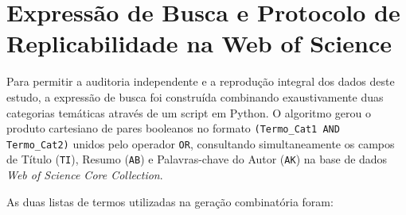 \appendix
\section{Expressão de Busca e Protocolo de Replicabilidade na Web of Science}\label{apendice:query_wos}

Para permitir a auditoria independente e a reprodução integral dos dados deste estudo, a expressão de busca foi construída combinando exaustivamente duas categorias temáticas através de um script em Python. O algoritmo gerou o produto cartesiano de pares booleanos no formato \texttt{(Termo\_Cat1 AND Termo\_Cat2)} unidos pelo operador \texttt{OR}, consultando simultaneamente os campos de Título (\texttt{TI}), Resumo (\texttt{AB}) e Palavras-chave do Autor (\texttt{AK}) na base de dados \emph{Web of Science Core Collection}.

As duas listas de termos utilizadas na geração combinatória foram:


